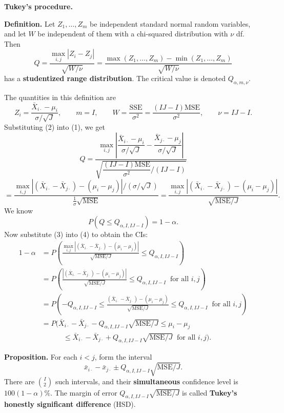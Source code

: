 \textbf{Tukey's procedure.}

\textbf{Definition.} Let $Z_1,\dots,Z_m$ be independent standard normal random variables, and let $W$ be independent of them with a chi-squared distribution with $\nu$ df. Then
\[
Q = \frac{\max_{i,j}|Z_i-Z_j|}{\sqrt{W/\nu}} = \frac{\max(Z_1,\dots,Z_m)-\min(Z_1,\dots,Z_m)}{\sqrt{W/\nu}} \tag{1}
\]
has a \textbf{studentized range distribution}. The critical value is denoted $Q_{\alpha,m,\nu}$.

The quantities in this definition are
\[
Z_i=\frac{\bar{X}_{i\cdot}-\mu_i}{\sigma/\sqrt{J}},\qquad m=I,\qquad W=\frac{\mathrm{SSE}}{\sigma^2}=\frac{(IJ-I)\mathrm{MSE}}{\sigma^2},\qquad \nu=IJ-I. \tag{2}
\]
Substituting (2) into (1), we get
\[
Q = \frac{\max_{i,j}\left|\dfrac{\bar{X}_{i\cdot}-\mu_i}{\sigma/\sqrt{J}}-\dfrac{\bar{X}_{j\cdot}-\mu_j}{\sigma/\sqrt{J}}\right|}{\sqrt{\dfrac{(IJ-I)\mathrm{MSE}}{\sigma^2}\Big/(IJ-I)}}
\]
\[
= \frac{\max_{i,j}\left|(\bar{X}_{i\cdot}-\bar{X}_{j\cdot})-(\mu_i-\mu_j)\right|\big/(\sigma/\sqrt{J})}{\frac{1}{\sigma}\sqrt{\mathrm{MSE}}}
= \frac{\max_{i,j}\left|(\bar{X}_{i\cdot}-\bar{X}_{j\cdot})-(\mu_i-\mu_j)\right|}{\sqrt{\mathrm{MSE}/J}}. \tag{3}
\]
We know
\[
P(Q\le Q_{\alpha,I,IJ-I})=1-\alpha. \tag{4}
\]
Now substitute (3) into (4) to obtain the CIs:
\begin{align*}
1-\alpha &= P\!\left(\frac{\max_{i,j}|(\bar{X}_{i\cdot}-\bar{X}_{j\cdot})-(\mu_i-\mu_j)|}{\sqrt{\mathrm{MSE}/J}}\le Q_{\alpha,I,IJ-I}\right)\\
&= P\!\left(\frac{|(\bar{X}_{i\cdot}-\bar{X}_{j\cdot})-(\mu_i-\mu_j)|}{\sqrt{\mathrm{MSE}/J}}\le Q_{\alpha,I,IJ-I}\ \text{ for all } i,j\right)\\
&= P\!\left(-Q_{\alpha,I,IJ-I}\le\frac{(\bar{X}_{i\cdot}-\bar{X}_{j\cdot})-(\mu_i-\mu_j)}{\sqrt{\mathrm{MSE}/J}}\le Q_{\alpha,I,IJ-I}\ \text{ for all } i,j\right)\\
&= P\Big(\bar{X}_{i\cdot}-\bar{X}_{j\cdot}-Q_{\alpha,I,IJ-I}\sqrt{\mathrm{MSE}/J}\le\mu_i-\mu_j\\
&\qquad\quad \le\bar{X}_{i\cdot}-\bar{X}_{j\cdot}+Q_{\alpha,I,IJ-I}\sqrt{\mathrm{MSE}/J}\ \text{ for all } i,j\Big).
\end{align*}

\textbf{Proposition.} For each $i<j$, form the interval
\[
\bar{x}_{i\cdot}-\bar{x}_{j\cdot}\pm Q_{\alpha,I,IJ-I}\sqrt{\mathrm{MSE}/J}.
\]
There are $\binom{I}{2}$ such intervals, and their \textbf{simultaneous} confidence level is $100(1-\alpha)\%$.
The margin of error $Q_{\alpha,I,IJ-I}\sqrt{\mathrm{MSE}/J}$ is called \textbf{Tukey's honestly significant difference} (HSD).

